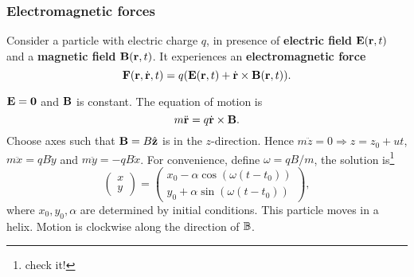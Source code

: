 \subsubsection*{Electromagnetic forces}
\begin{law}
    Consider a particle with electric charge $q$, in presence of \textbf{electric field} $ {\bf E}({\bf r},t) $ and a \textbf{magnetic field} $ {\bf B}({\bf r},t) $. It experiences an \textbf{electromagnetic force}
    \[
        {\bf F}({\bf r},\dot{{\bf r}},t) = q({\bf E}({\bf r},t)+\dot{{\bf r}}\times {\bf B}({\bf r},t)).
    \]
\end{law}
\begin{example}
    $ {\bf E} = \mathbf{0} $ and $ {\bf B} $ is constant. The equation of motion is 
    \[
        m \ddot{{\bf r}} = q \dot{{\bf r}} \times {\bf B}.
    \]
    Choose axes such that ${\bf B} = B \hat{{\bf z}}$ is in the $z$-direction. Hence $m\ddot{z}=0 \Rightarrow z=z_0+ut$, $ m \ddot{x}=qB \dot{y} $ and $ m \ddot{y}=-qB \dot{x} $. For convenience, define $ \omega = qB/m $, the solution is\footnote{check it!}
    \[
        \begin{pmatrix}
            x \\ y
        \end{pmatrix}=
        \begin{pmatrix}
            x_0-\alpha \cos (\omega(t-t_0)) \\ y_0+\alpha \sin (\omega(t-t_0))
        \end{pmatrix},
    \] 
    where $x_0,y_0,\alpha$ are determined by initial conditions. This particle moves in a helix. Motion is clockwise along the direction of $ {\mathbb{B}} $.
    \begin{center}
    \end{center}
\end{example}